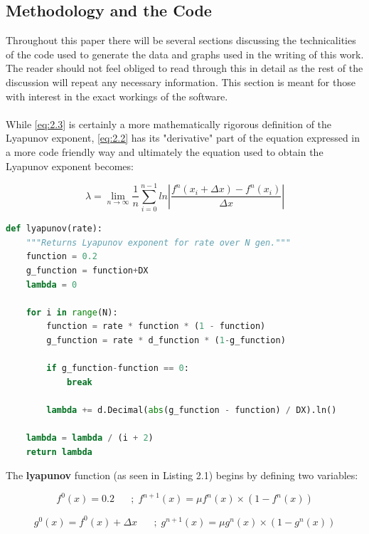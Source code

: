\subsection{Methodology and the Code}
\label{section:MethodologyAndCode}
Throughout this paper there will be several sections 
discussing the technicalities of the code used to generate
the data and graphs used in the writing of this work.
The reader should not feel obliged to read through this in detail
as the rest of the discussion will repeat any necessary information.
This section is meant for those with interest in the exact workings
of the software.
\paragraph{}
While \eqref{eq:2.3} is certainly a more mathematically rigorous 
definition of the Lyapunov exponent, \eqref{eq:2.2} has its 
"derivative" part of the equation expressed in a more code friendly
way and ultimately the equation used to obtain the Lyapunov exponent
becomes:

\begin{equation}
    \label{eq:2.4}
    \lambda = \lim_{n\to\infty} \frac{1}{n} \sum_{i=0}^{n-1} ln\left| \frac{f^n (x_i+\Delta x) - f^n (x_i)}{\Delta x} \right| 
\end{equation}

\begin{lstlisting}[language=Python, caption=Lyapunov\_Exponent.py excerpt]
def lyapunov(rate):
    """Returns Lyapunov exponent for rate over N gen."""
    function = 0.2
    g_function = function+DX
    lambda = 0

    for i in range(N):
        function = rate * function * (1 - function)
        g_function = rate * d_function * (1-g_function)

        if g_function-function == 0:
            break

        lambda += d.Decimal(abs(g_function - function) / DX).ln()

    lambda = lambda / (i + 2)
    return lambda
\end{lstlisting}

The \textbf{lyapunov} function (as seen in Listing 2.1) begins by defining two variables:

\begin{equation}
    f^0(x)=0.2\; \; \; \; \; \; ;\;f^{n+1}(x)=\mu f^n(x) \times (1-f^n(x))
\end{equation}
    
\begin{equation}
    g^0(x)=f^0(x) + \Delta x \; \; \; \; \; \; ;\;g^{n+1}(x)=\mu g^n(x) \times (1-g^n(x))
\end{equation}



